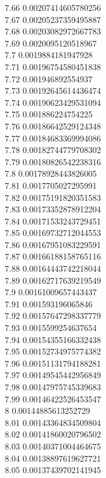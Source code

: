{7.66	0.00207414605780256\\
7.67	0.00205237359495887\\
7.68	0.00203082972667783\\
7.69	0.0020095120518967\\
7.7	0.0019884181947928\\
7.71	0.00196754580451838\\
7.72	0.001946892554937\\
7.73	0.00192645614436474\\
7.74	0.00190623429531094\\
7.75	0.001886224754225\\
7.76	0.00186642529124348\\
7.77	0.00184683369994086\\
7.78	0.00182744779708302\\
7.79	0.00180826542238316\\
7.8	0.00178928443826005\\
7.81	0.0017705027295991\\
7.82	0.00175191820351583\\
7.83	0.00173352878912204\\
7.84	0.00171533243729451\\
7.85	0.00169732712044553\\
7.86	0.00167951083229591\\
7.87	0.00166188158765116\\
7.88	0.00164443742218044\\
7.89	0.00162717639219549\\
7.9	0.00161009657443437\\
7.91	0.001593196065846\\
7.92	0.00157647298337779\\
7.93	0.0015599254637654\\
7.94	0.00154355166332438\\
7.95	0.00152734975774382\\
7.96	0.00151131794188281\\
7.97	0.00149545442956849\\
7.98	0.00147975745339683\\
7.99	0.00146422526453547\\
8	0.00144885613252729\\
8.01	0.00143364834509804\\
8.02	0.00141860020796502\\
8.03	0.00140371004464675\\
8.04	0.00138897619627721\\
8.05	0.00137439702141945\\
}
